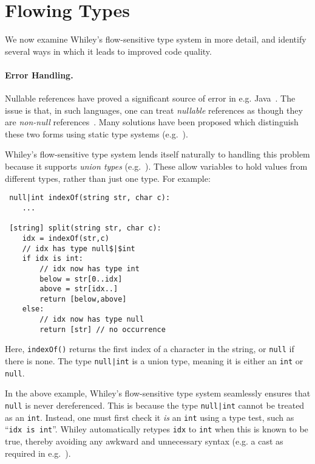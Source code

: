 \section{Flowing Types}
We now examine Whiley's flow-sensitive type system in more detail, and
 identify several ways in which it leads to improved code quality.

\paragraph{Error Handling.}
Nullable references have proved a significant source of error in
e.g. Java~\cite{Hoa09}.  The issue is that, in such
languages, one can treat {\em nullable} references as though they are
{\em non-null} references~\cite{Pier02}.  Many solutions have been
proposed which distinguish these two forms using static type
systems (e.g.~\cite{PQVHV01,FL03,KH07,CFJJ06,CJ07,MPPD08,Hub08,HJP08}).

Whiley's flow-sensitive type system lends itself naturally to handling
this problem because it supports {\em union types}
(e.g.~\cite{BC91,IN07}).  These allow variables to hold values from
different types, rather than just one type.  For example:

\begin{lstlisting}
 null|int indexOf(string str, char c):
    ...

 [string] split(string str, char c):
    idx = indexOf(str,c)
    // idx has type null$|$int
    if idx is int:
        // idx now has type int
        below = str[0..idx]
        above = str[idx..]
        return [below,above]
    else:
        // idx now has type null
        return [str] // no occurrence
\end{lstlisting}
Here, \lstinline{indexOf()} returns the first index of a character in
the string, or \lstinline{null} if there is none.  The type
\lstinline{null|int} is a union type, meaning it is either an
\lstinline{int} or \lstinline{null}.

In the above example, Whiley's flow-sensitive type system seamlessly
ensures that \lstinline{null} is never dereferenced.  This is because
the type \lstinline{null|int} cannot be treated as an \lstinline{int}.
Instead, one must first check it {\em is} an \lstinline{int} using a
type test, such as ``\lstinline{idx is int}''.  Whiley automatically
retypes \lstinline{idx} to \lstinline{int} when this is known to be
true, thereby avoiding any awkward and unnecessary syntax (e.g. a cast
as required in e.g.~\cite{ANMM06,MPPD08}).
